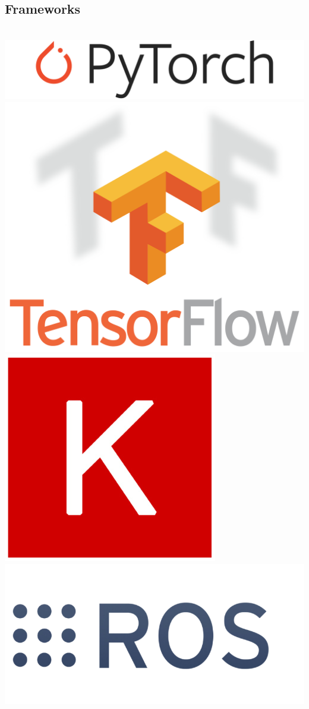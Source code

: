 \documentclass[]{friggeri-cv}
\begin{document}
\begin{aside}
        \section{Frameworks}
	~        
     \includegraphics[scale=0.13]{img/pt.png}
     \includegraphics[scale=0.04]{img/tf.png}
     \includegraphics[scale=0.18]{img/K.jpg}
     \includegraphics[scale=0.1]{img/ros2.png}

\end{aside}
\end{document}
